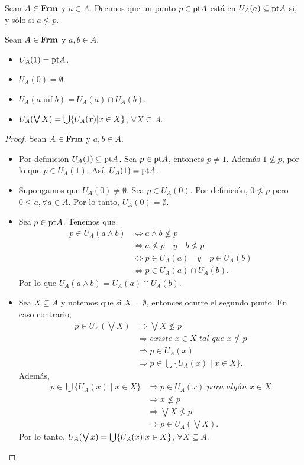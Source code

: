 \documentclass{comunicaciones}
\begin{document}
Sean $A\in \mathbf{Frm}$ y $a\in A$. Decimos que un punto $p\in \mathrm{pt} A$ está en $U_A(a)\subseteq \mathrm{pt} A$ si, y sólo si $a\not\leq p$.
\begin{lem}
  Sean $A\in \mathbf{Frm}$ y $a,b\in A$.
  \begin{itemize}
      \item $U_A(1)=\mathrm{pt} A$.
      \item $U_A(0)=\emptyset$.
      \item $U_A(a\inf b)=U_A(a)\cap U_A(b)$.
      \item $U_A(\bigvee X)=\bigcup \{U_A(x)|x\in X\}$, $\forall X\subseteq A$.
  \end{itemize}
\end{lem}
\begin{proof}
  Sean $A\in \mathbf{Frm}$ y $a,b\in A$.
\begin{itemize}
\item Por definición $U_A(1)\subseteq \mathrm{pt} A$. Sea $p\in \mathrm{pt} A$, entonces $p\neq 1$. Además $1\not\leq p$, por lo que $p\in U_A(1)$. Así, $U_A(1)=\mathrm{pt} A$.
\item Supongamos que $U_A(0)\neq \emptyset$. Sea $p\in U_A(0)$. Por definición, $0\not\leq p$ pero $0\leq a, \forall a\in A$. Por lo tanto, $U_A(0)=\emptyset$.
\item Sea $p\in \mathrm{pt} A$. Tenemos que
\begin{align*}
p\in U_A(a\wedge b)&\iff a\wedge b\not\leq p\\
&\iff a\not\leq p\quad y\quad b\not\leq p\\
&\iff p\in U_A(a)\quad y\quad p\in U_A(b)\\
&\iff p\in U_A(a)\cap U_A(b).
\end{align*}
Por lo que $U_A(a\wedge b)=U_A(a)\cap U_A(b)$.
\item Sea $X\subseteq A$ y notemos que si $X=\emptyset$, entonces ocurre el segundo punto. En caso contrario,
\begin{align*}
p\in U_A(\bigvee X)&\Rightarrow \bigvee X\not\leq p\\
&\Rightarrow \textit{existe }x\in X\textit{ tal que }x\not\leq p\\
&\Rightarrow p\in U_A(x)\\
&\Rightarrow p\in \bigcup \{U_A(x)\mid x\in X\}.
\end{align*}
Además,
\begin{align*}
p\in \bigcup\{U_A(x)\mid x\in X\}&\Rightarrow p\in U_A(x)\textit{ para algún }x\in X\\
&\Rightarrow x\not \leq p\\
&\Rightarrow \bigvee X\not\leq p\\
&\Rightarrow p\in U_A(\bigvee X).
\end{align*}
Por lo tanto, $U_A(\bigvee x)=\bigcup \{U_A(x)|x\in X\}$, $\forall X\subseteq A$.
\end{itemize}
\end{proof}
\end{document}
